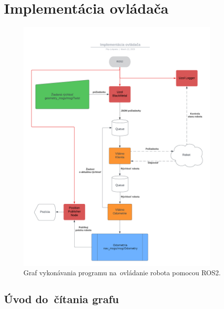 
\section{Implementácia ovládača}
\label{sec:program}

\begin{figure}[!htbp]
	\begin{center}
		\includegraphics[width=0.9\textwidth]{img/BlackMetal_flowchart.png}
	\end{center}
	\caption{Graf vykonávania programu na~ovládanie robota pomocou ROS2.}
	\label{fig:flowchart}
\end{figure}

\subsection{Úvod do~čítania grafu}
\label{sec:citanie_grafu}

